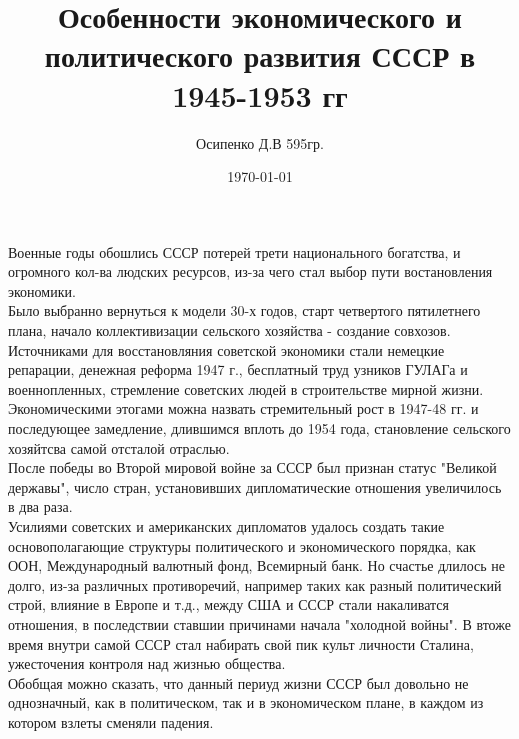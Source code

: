 \documentclass[a4paper, 12pt]{article}
\title{Особенности экономического и политического развития СССР в 1945-1953 гг}
\author{Осипенко Д.В 595гр.}
\date{\today}
\begin{document}
\sffamily
\maketitle
Военные годы обошлись СССР потерей трети национального богатства, и огромного кол-ва людских ресурсов, из-за чего стал выбор пути востановления экономики.\\
Было выбранно вернуться к модели 30-х годов, старт четвертого пятилетнего плана, начало коллективизации сельского хозяйства - создание совхозов. Источниками для восстановляния советской экономики стали немецкие репарации, денежная реформа 1947 г., бесплатный труд узников ГУЛАГа и военнопленных, стремление советских людей в строительстве мирной жизни.\\
Экономическими этогами можна назвать стремительный рост в 1947-48 гг. и последующее замедление, длившимся вплоть до 1954 года, становление сельского хозяйтсва самой отсталой отраслью.\\

После победы во Второй мировой войне за СССР был признан статус "Великой державы", число стран, установивших дипломатические отношения увеличилось в два раза.\\
Усилиями советских и американских дипломатов удалось создать такие основополагающие структуры политического и экономического порядка, как ООН, Международный валютный фонд, Всемирный банк.  Но счастье длилось не долго, из-за различных противоречий, например таких как разный политический строй, влияние в Европе и т.д., между США и СССР стали накаливатся отношения, в последствии ставшии причинами начала "холодной войны". В втоже время внутри самой СССР стал набирать свой пик культ личности Сталина, ужесточения контроля над жизнью общества.\\

Обобщая можно сказать, что данный периуд жизни СССР был довольно не однозначный, как в политическом, так и в экономическом плане, в каждом из котором взлеты сменяли падения.
\end{document}
